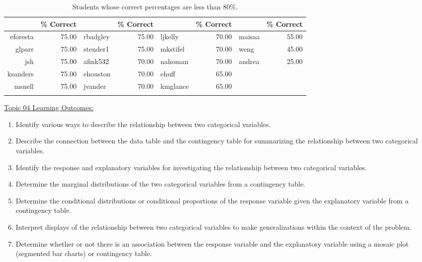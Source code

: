 \documentclass[12pt,english,nohyper]{tufte-handout}\usepackage[]{graphicx}\usepackage[]{color}
\begin{document}
\begin{fullwidth}
\makeatletter\setlength\hsize{\@tufte@fullwidth}\makeatother
\begin{longtable}{rr|lr|lr|lr}
  \hline
  & \% Correct &   & \% Correct &   & \% Correct &   & \% Correct \\ 
  \hline
eforesta & 75.00 & rbadgley & 75.00 & ljkelly & 70.00 & maisaa & 55.00 \\ 
  glparr & 75.00 & stender1 & 75.00 & mkstifel & 70.00 & weng & 45.00 \\ 
  jsh & 75.00 & afink532 & 70.00 & nahoman & 70.00 & andrea & 25.00 \\ 
  ksanders & 75.00 & ehouston & 70.00 & ehuff & 65.00 &  &  \\ 
  msnell & 75.00 & jvander & 70.00 & kmglance & 65.00 &  &  \\ 
   \hline
\hline
\caption{Students whose correct percentages are less than 80\%.} 
\label{tab:studentsbelow80}
\end{longtable}

\end{fullwidth}



\vspace{-2mm}

\noindent
\underline{Topic 04 Learning Outcomes:}
\vspace{2mm}

\begin{fullwidth}
\begin{enumerate}[label=\Alph*.,itemsep=-\parsep,leftmargin=*]
  \item
Identify various ways to describe the relationship between two categorical variables.
\item Describe the connection between the data table and the contingency table for summarizing the relationship between two categorical variables.
\item Identify the response and explanatory variables for investigating the relationship between two categorical variables.
\item Determine the marginal distributions of the two categorical variables from a contingency table.
\item Determine the conditional distributions or conditional proportions of the response variable given the explanatory variable from a contingency table.
\item Interpret displays of the relationship between two categorical variables to make generalizations within the context of the problem.
\item Determine whether or not there is an association between the response variable and the explanatory variable using a mosaic plot (segmented bar charts) or contingency table.

\end{enumerate}
\end{fullwidth}
\end{document}
